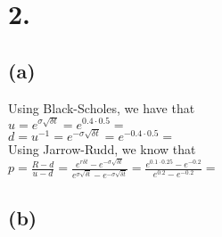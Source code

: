 \documentclass{article}
\begin{document}
\section*{2.}
{\Large

\subsection*{(a)}

Using Black-Scholes, we have that \\
$u = e^{\sigma \sqrt{\delta t}} = e^{0.4 \cdot 0.5} = $  \\
$d = u^{-1} = e^{-\sigma \sqrt{\delta t}} = e^{-0.4 \cdot 0.5} = $  \\
Using Jarrow-Rudd, we know that \\
$p = \frac{R - d}{u - d} = \frac{e^{r \delta t} - e^{-\sigma \sqrt{\delta t}}}{e^{\sigma \sqrt{\delta t}} - e^{-\sigma \sqrt{\delta t}}} = \frac{e^{0.1 \cdot 0.25} - e^{-0.2}}{e^{0.2} - e^{-0.2}} = $ 


\subsection*{(b)}

}
\end{document}
